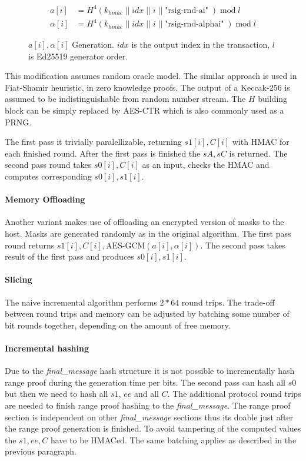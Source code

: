 \documentclass[]{article}
\begin{document}
\begin{figure}[H]

	\begin{equation}
	\begin{split}
	a[i] &= H^4(k_{hmac} \; || \; idx \; || \; i \; || \; \text{"rsig-rnd-ai"} \; ) \; \text{mod} \; l  \\
	\alpha[i] &= H^4(k_{hmac} \; || \; idx \; || \; i \; || \; \text{"rsig-rnd-alphai"} \; ) \; \text{mod} \; l
	\end{split}
	\end{equation}

	\caption{$a[i], \alpha[i]$ Generation. $idx$ is the output index in the transaction, $l$ is Ed25519 generator order.} \label{eq:masks}
\end{figure}

This modification assumes random oracle model. The similar approach is used in Fiat-Shamir heuristic, in zero knowledge proofs. The output of a Keccak-256 is assumed to be indistinguishable from random number stream. The $H$ building block can be simply replaced by AES-CTR which is also commonly used as a PRNG.

The first pass it trivially paralellizable, returning $s1[i], C[i]$ with HMAC for each finished round. 
After the first pass is finished the $sA, sC$ is returned. The second pass round takes $s0[i], C[i]$ as an input, checks the HMAC and computes corresponding $s0[i], s1[i]$.

\paragraph{Memory Offloading}
Another variant makes use of offloading an encrypted version of masks to the host.
Masks are generated randomly as in the original algorithm.
The first pass round returns $s1[i], C[i], \text{AES-GCM}(a[i], \alpha[i])$.
The second pass takes result of the first pass and produces $s0[i], s1[i]$.

\paragraph{Slicing} 
The naive incremental algorithm performs $2 * 64$ round trips. The trade-off between round trips and memory can be adjusted by batching some number of bit rounds together, depending on the amount of free memory. 

\paragraph{Incremental hashing}
Due to the \emph{final\_message} hash structure it is not possible to incrementally hash range proof during the generation time per bits. The second pass can hash all $s0$ but then we need to hash all $s1$, $ee$ and all $C$. The additional protocol round trips are needed to finish range proof hashing to the \emph{final\_message}. The range proof section is independent on other \emph{final\_message} sections thus its doable just after the range proof generation is finished. To avoid tampering of the computed values the $s1, ee, C$ have to be HMACed. The same batching applies as described in the previous paragraph. 
\end{document}
